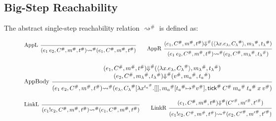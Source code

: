 \documentclass[acmsmall,screen]{acmart}
\theoremstyle{definition}
\newcommand*{\A}[1]{{#1}^{\#}}
\newcommand*{\mem}{m}
\newcommand*{\link}[2]{{#1}\mathtt{!}{#2}}
\newcommand*{\tick}{\mathsf{tick}}
\begin{document}
\subsection{Big-Step Reachability}
The abstract single-step reachability relation $\A\rightsquigarrow$ is defined as:

\begin{figure}[htb]
  \centering
  \footnotesize
  \[
    \begin{prooftree}
      \infer[left label={AppL}]0{
      (e_{1}\:e_{2}, \A{C}, \A{\mem}, \A{t})
      \A\rightsquigarrow
      (e_{1}, \A{C}, \A{\mem}, \A{t})
      }
    \end{prooftree}\qquad
    \begin{prooftree}
      \hypo{
        \begin{matrix}
          (e_{1}, \A{C}, \A{\mem}, \A{t})
          \A{\Downarrow}
          (\langle\lambda x.e_{\lambda}, \A{C_{\lambda}}\rangle, \A{\mem_{\lambda}}, \A{t_{\lambda}})
        \end{matrix}
      }
      \infer[left label={AppR}]1{
      (e_{1}\:e_{2}, \A{C}, \A{\mem}, \A{t})
      \A\rightsquigarrow
      (e_{2}, \A{C}, \A{\mem_{\lambda}}, \A{t_{\lambda}})
      }
    \end{prooftree}
  \]

  \[
    \begin{prooftree}
      \hypo{
        \begin{matrix}
          (e_{1}, \A{C}, \A{\mem}, \A{t})
          \A{\Downarrow}
          (\langle\lambda x.e_{\lambda}, \A{C_{\lambda}}\rangle, \A{\mem_{\lambda}}, \A{t_{\lambda}}) \\
          (e_{2}, \A{C}, \A{\mem_{\lambda}}, \A{t_{\lambda}})
          \A{\Downarrow}
          (\A{v}, \A{\mem_{a}}, \A{t_{a}})
        \end{matrix}
      }
      \infer[left label={AppBody}]1{
      (e_{1}\:e_{2}, \A{C}, \A{\mem}, \A{t})
      \A\rightsquigarrow
      (e_{\lambda}, \A{C_{\lambda}}[\lambda x^{\A{t_{a}}}.[]], \A{\mem_{a}}[\A{t_{a}}\A{\mapsto} \A{v}], \A{\tick}\:\A{C}\:\A{\mem_a}\:\A{t_{a}}\:x\:\A{v})
      }
    \end{prooftree}
  \]

  \[
    \begin{prooftree}
      \infer[left label=LinkL]0{
      (\link{e_{1}}{e_{2}}, \A{C}, \A{\mem}, \A{t})
      \A\rightsquigarrow
      (e_{1}, \A{C}, \A{\mem}, \A{t})
      }
    \end{prooftree}\qquad
    \begin{prooftree}
      \hypo{
        \begin{matrix}
          (e_{1}, \A{C}, \A{\mem}, \A{t})
          \A{\Downarrow}
          (\A{C'}, \A{\mem'}, \A{t'})
        \end{matrix}
      }
      \infer[left label=LinkR]1{
      (\link{e_{1}}{e_{2}}, \A{C}, \A{\mem}, \A{t})
      \A\rightsquigarrow
      (e_{2}, \A{C'}, \A{\mem'}, \A{t'})
      }
    \end{prooftree}
  \]


\end{figure}
\end{document}
